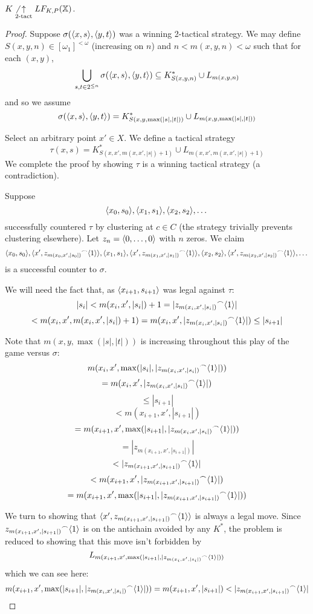 \begin{thm}
$K\not\underset{2\text{-tact}}{\uparrow}LF_{K,P}(\mathbb{X})$.
\end{thm}

\begin{proof}
Suppose $\sigma(\langle x,s\rangle,\langle y,t\rangle)$ was a winning 2-tactical strategy. We may define $S(x,y,n)\in [\omega_1]^{<\omega}$ (increasing on $n$) and $n<m(x,y,n)<\omega$ such that for each $(x,y)$,
  \[
    \bigcup_{s,t \in 2^{\leq n}} \sigma(\langle x,s\rangle,\langle y,t\rangle) \subseteq 
    K^*_{S(x,y,n)} \cup L_{m(x,y,n)}
  \]
and so we assume
  \[
    \sigma(\langle x,s\rangle,\langle y,t\rangle) =
    K^*_{S(x,y,\max(|s|,|t|))} \cup L_{m(x,y,\max(|s|,|t|))}
  \]

Select an arbitrary point $x' \in X$. We define a tactical strategy 
  \[
  \tau(x,s) = 
  K^*_{S(x,x',m(x,x',|s|)+1)} \cup L_{m(x,x',m(x,x',|s|)+1)}
  \]
We complete the proof by showing $\tau$ is a winning tactical strategy (a contradiction).

Suppose
\[
\langle x_0, s_0\rangle, \langle x_1, s_1\rangle, \langle x_2, s_2\rangle, \dots
\]
successfully countered $\tau$ by clustering at $c\in C$ (the strategy trivially prevents clustering elsewhere). Let $z_n = \langle0,\dots,0\rangle$ with $n$ zeros. We claim
\[
\langle x_0, s_0\rangle, \langle x', {z_{m(x_0,x',|s_0|)}}^\frown\langle1\rangle\rangle, \langle x_1, s_1\rangle, \langle x', {z_{m(x_1,x',|s_1|)}}^\frown\langle1\rangle\rangle,  \langle x_2, s_2\rangle, \langle x', {z_{m(x_2,x',|s_2|)}}^\frown\langle1\rangle\rangle, \dots
\]
is a successful counter to $\sigma$.

We will need the fact that, as $\langle x_{i+1},s_{i+1}\rangle$ was legal against $\tau$:
  \[
    |s_i| <
    m(x_i,x',|s_i|)+1 =
    |{z_{m(x_i,x',|s_i|)}}^\frown\langle1\rangle| 
  \]
  \[
    <
    m(x_i,x',m(x_i,x',|s_i|)+1) =
    m(x_i,x',|{z_{m(x_i,x',|s_i|)}}^\frown\langle1\rangle|) \leq
    |s_{i+1}|
  \]

Note that $m(x,y,\max(|s|,|t|))$ is increasing throughout this play of the game versus $\sigma$:
  \[
    m(x_i,x',\max(|s_i|,|{z_{m(x_i,x',|s_i|)}}^\frown\langle1\rangle|))
  \]
  \[
    =
    m(x_i,x',|{z_{m(x_i,x',|s_i|)}}^\frown\langle1\rangle|)
  \]
  \[
    \leq
    |s_{i+1}| 
  \]
  \[
    <
    m(x_{i+1},x',|s_{i+1}|)
  \]
  \[
    =
    m(x_{i+1},x',\max(|s_{i+1}|,|{z_{m(x_i,x',|s_i|)}}^\frown\langle1\rangle|))
  \]
  \[
    =
    |{z_{m(x_{i+1},x',|s_{i+1}|)}}|
  \]
  \[
    <
    |{z_{m(x_{i+1},x',|s_{i+1}|)}}^\frown\langle1\rangle|
  \]
  \[
    <
    m(x_{i+1},x',|{z_{m(x_{i+1},x',|s_{i+1}|)}}^\frown\langle1\rangle|)
  \]
  \[
    =
    m(x_{i+1},x',\max(|s_{i+1}|,|{z_{m(x_{i+1},x',|s_{i+1}|)}}^\frown\langle1\rangle|))
  \]

We turn to showing that $\langle x', {z_{m(x_{i+1},x',|s_{i+1}|)}}^\frown\langle1\rangle\rangle$ is always a legal move. Since ${z_{m(x_{i+1},x',|s_{i+1}|)}}^\frown\langle1\rangle$ is on the antichain avoided by any $K^*$, the problem is reduced to showing that this move isn't forbidden by
  \[
  L_{m(x_{i+1},x',\max(|s_{i+1}|,|{z_{m(x_i,x',|s_i|)}}^\frown\langle1\rangle|))}
  \]
which we can see here:
  \[
    m(x_{i+1},x',\max(|s_{i+1}|,|{z_{m(x_i,x',|s_i|)}}^\frown\langle1\rangle|)) =
    m(x_{i+1},x',|s_{i+1}|) <
    |{z_{m(x_{i+1},x',|s_{i+1}|)}}^\frown\langle1\rangle|
  \]


\end{proof}
